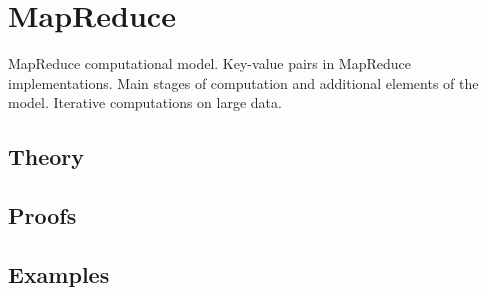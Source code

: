 
\section{MapReduce}
\label{sec:1.3.12-mapreduce}

\begin{ticket}
MapReduce computational model. Key-value pairs in MapReduce implementations. Main stages of computation and additional elements of the model. Iterative computations on large data.
\end{ticket}

\subsection*{Theory}

\subsection*{Proofs}

\subsection*{Examples}
